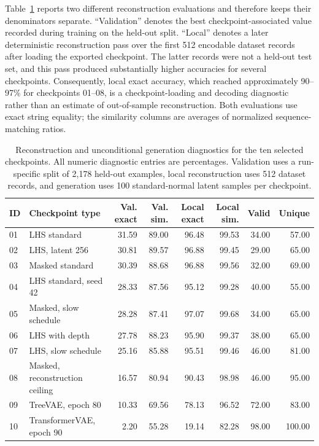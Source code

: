 Table~\ref{tab:autoencoder-diagnostics} reports two different reconstruction evaluations and therefore keeps their denominators separate. ``Validation'' denotes the best checkpoint-associated value recorded during training on the held-out split. ``Local'' denotes a later deterministic reconstruction pass over the first 512 encodable dataset records after loading the exported checkpoint. The latter records were not a held-out test set, and this pass produced substantially higher accuracies for several checkpoints. Consequently, local exact accuracy, which reached approximately 90--97\% for checkpoints 01--08, is a checkpoint-loading and decoding diagnostic rather than an estimate of out-of-sample reconstruction. Both evaluations use exact string equality; the similarity columns are averages of normalized sequence-matching ratios.

\begin{table}[H]
\centering
\caption{Reconstruction and unconditional generation diagnostics for the ten selected checkpoints. All numeric diagnostic entries are percentages. Validation uses a run-specific split of 2,178 held-out examples, local reconstruction uses 512 dataset records, and generation uses 100 standard-normal latent samples per checkpoint.}
\label{tab:autoencoder-diagnostics}
{\scriptsize
\setlength{\tabcolsep}{3.2pt}
\begin{tabular}{llrrrrrr}
\hline
ID & Checkpoint type & Val. exact & Val. sim. & Local exact & Local sim. & Valid & Unique \\
\hline
01 & LHS standard       & 31.59 & 89.00 & 96.48 & 99.53 & 34.00 & 57.00 \\
02 & LHS, latent 256    & 30.81 & 89.57 & 96.88 & 99.45 & 29.00 & 65.00 \\
03 & Masked standard    & 30.39 & 88.68 & 96.88 & 99.56 & 32.00 & 69.00 \\
04 & LHS standard, seed 42 & 28.33 & 87.56 & 95.12 & 99.28 & 40.00 & 55.00 \\
05 & Masked, slow schedule & 28.28 & 87.41 & 97.07 & 99.68 & 34.00 & 65.00 \\
06 & LHS with depth     & 27.78 & 88.23 & 95.90 & 99.37 & 38.00 & 65.00 \\
07 & LHS, slow schedule & 25.16 & 85.88 & 95.51 & 99.46 & 46.00 & 81.00 \\
08 & Masked, reconstruction ceiling & 16.57 & 80.94 & 90.43 & 98.98 & 46.00 & 95.00 \\
09 & TreeVAE, epoch 80  & 10.33 & 69.56 & 78.13 & 96.52 & 72.00 & 83.00 \\
10 & TransformerVAE, epoch 90 & 2.20 & 55.28 & 19.14 & 82.28 & 98.00 & 100.00 \\
\hline
\end{tabular}}
\end{table}

